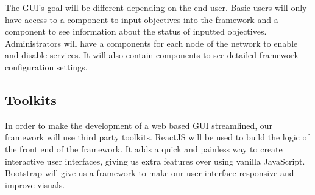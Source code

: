 \documentclass[draftclsnofoot, onecolumn, compsoc, 10pt]{IEEEtran}
\begin{document}
The GUI's goal will be different depending on the end user. Basic users will only have access to a component to input objectives into the framework and a component to see information about the status of inputted objectives. Administrators will have a components for each node of the network to enable and disable services. It will also contain components to see detailed framework configuration settings.


\subsection{Toolkits}
In order to make the development of a web based GUI streamlined, our framework will use third party toolkits. ReactJS will be used to build the logic of the front end of the framework. It adds a quick and painless way to create interactive user interfaces, giving us extra features over using vanilla JavaScript. Bootstrap will give us a framework to make our user interface responsive and improve visuals.
\end{document}
